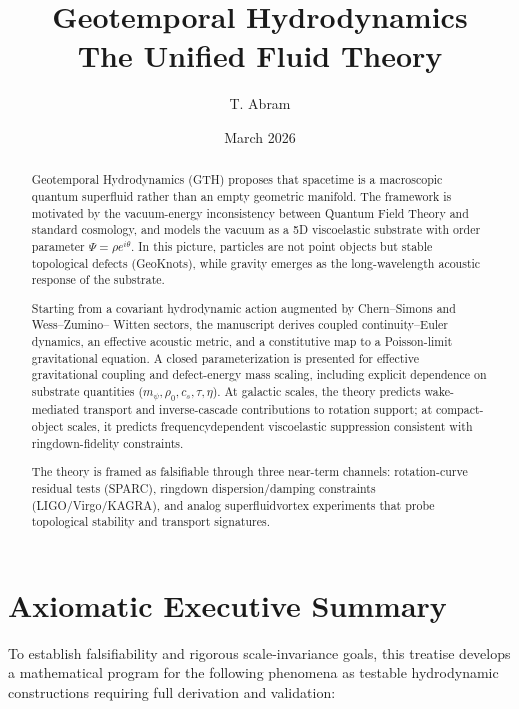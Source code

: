 \documentclass[11pt,a4paper]{article}
\title{Geotemporal Hydrodynamics\\ \Large The Unified Fluid Theory}
\author{T. Abram}
\date{March 2026}
\begin{document}
\maketitle

\begin{abstract}
Geotemporal Hydrodynamics (GTH) proposes that spacetime is a macroscopic quantum superfluid
rather than an empty geometric manifold. The framework is motivated by the vacuum-energy inconsistency between Quantum Field Theory and standard cosmology, and models the vacuum as a 5D
viscoelastic substrate with order parameter $\Psi = \rho e^{i\theta}$. In this picture, particles are not point objects
but stable topological defects (GeoKnots), while gravity emerges as the long-wavelength acoustic
response of the substrate.

Starting from a covariant hydrodynamic action augmented by Chern--Simons and Wess--Zumino--
Witten sectors, the manuscript derives coupled continuity--Euler dynamics, an effective acoustic metric,
and a constitutive map to a Poisson-limit gravitational equation. A closed parameterization is presented
for effective gravitational coupling and defect-energy mass scaling, including explicit dependence on
substrate quantities ($m_\psi, \rho_0, c_s, \tau, \eta$). At galactic scales, the theory predicts wake-mediated transport
and inverse-cascade contributions to rotation support; at compact-object scales, it predicts frequencydependent viscoelastic suppression consistent with ringdown-fidelity constraints.

The theory is framed as falsifiable through three near-term channels: rotation-curve residual tests
(SPARC), ringdown dispersion/damping constraints (LIGO/Virgo/KAGRA), and analog superfluidvortex experiments that probe topological stability and transport signatures.
\end{abstract}

\section*{Axiomatic Executive Summary}
To establish falsifiability and rigorous scale-invariance goals, this treatise develops a mathematical
program for the following phenomena as testable hydrodynamic constructions requiring full derivation
and validation:
\end{document}
